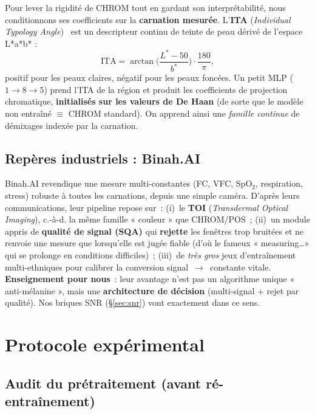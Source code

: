 \documentclass[11pt,a4paper]{article}
\begin{document}
Pour lever la rigidité de CHROM tout en gardant son interprétabilité, nous
conditionnons ses coefficients sur la \textbf{carnation mesurée}. L'\textbf{ITA}
(\emph{Individual Typology Angle})~\cite{chardon1991} est un descripteur continu
de teinte de peau dérivé de l'espace L*a*b* :
\[
\mathrm{ITA} = \arctan\!\Big(\frac{L^* - 50}{b^*}\Big)\cdot\frac{180}{\pi},
\]
positif pour les peaux claires, négatif pour les peaux foncées. Un petit MLP
($1\!\to\!8\!\to\!5$) prend l'ITA de la région et produit les coefficients de
projection chromatique, \textbf{initialisés sur les valeurs de De Haan} (de sorte
que le modèle non entraîné $\equiv$ CHROM standard). On apprend ainsi une
\emph{famille continue} de démixages indexée par la carnation.

\subsection{Repères industriels : Binah.AI}
\label{sec:binah}

Binah.AI revendique une mesure multi-constantes (FC, VFC, SpO$_2$, respiration,
stress) robuste à toutes les carnations, depuis une simple caméra. D'après leurs
communications, leur pipeline repose sur~: (i)~le \textbf{TOI} (\emph{Transdermal
Optical Imaging}), c.-à-d. la même famille « couleur » que CHROM/POS~; (ii)~un
module appris de \textbf{qualité de signal (SQA)} qui \textbf{rejette} les fenêtres
trop bruitées et ne renvoie une mesure que lorsqu'elle est jugée fiable (d'où le
fameux « measuring\dots » qui se prolonge en conditions difficiles)~; (iii)~de
\emph{très gros} jeux d'entraînement multi-ethniques pour calibrer la conversion
signal~$\rightarrow$~constante vitale. \textbf{Enseignement pour nous}~: leur
avantage n'est pas un algorithme unique « anti-mélanine », mais une
\textbf{architecture de décision} (multi-signal + rejet par qualité). Nos briques
SNR (§\ref{sec:snr}) vont exactement dans ce sens.

\section{Protocole expérimental}

\subsection{Audit du prétraitement (avant ré-entraînement)}
\end{document}
